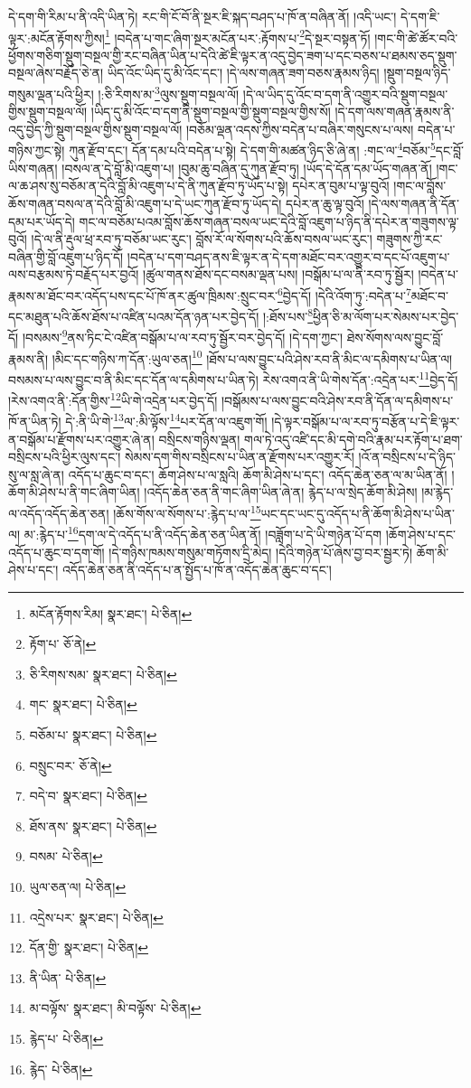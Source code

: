 དེ་དག་གི་རིམ་པ་ནི་འདི་ཡིན་ཏེ། རང་གི་ངོ་བོ་ནི་སྔར་ཇི་སྐད་བཤད་པ་ཁོ་ན་བཞིན་ནོ། །འདི་ཡང་། དེ་དག་ཇི་ལྟར་:མངོན་རྟོགས་ཀྱིས།\footnote{མངོན་རྟོགས་རིམ།  སྣར་ཐང་།  པེ་ཅིན། } །བདེན་པ་གང་ཞིག་སྔར་མངོན་པར་:རྟོགས་པ་\footnote{རྟོག་པ་  ཅོ་ནེ། }དེ་སྔར་བསྟན་ཏོ། །གང་གི་ཚེ་ཚོར་བའི་ཕྱོགས་གཅིག་སྡུག་བསྔལ་གྱི་རང་བཞིན་ཡིན་པ་དེའི་ཚེ་ཇི་ལྟར་ན་འདུ་བྱེད་ཟག་པ་དང་བཅས་པ་ཐམས་ཅད་སྡུག་བསྔལ་ཞེས་བརྗོད་ཅེ་ན། ཡིད་འོང་ཡིད་དུ་མི་འོང་དང་། །དེ་ལས་གཞན་ཟག་བཅས་རྣམས་ཉིད། །སྡུག་བསྔལ་ཉིད་གསུམ་ལྡན་པའི་ཕྱིར། །:ཅི་རིགས་མ་\footnote{ཅི་རིགས་སམ་  སྣར་ཐང་།  པེ་ཅིན། }ལུས་སྡུག་བསྔལ་ལོ། །དེ་ལ་ཡིད་དུ་འོང་བ་དག་ནི་འགྱུར་བའི་སྡུག་བསྔལ་གྱིས་སྡུག་བསྔལ་ལོ། །ཡིད་དུ་མི་འོང་བ་དག་ནི་སྡུག་བསྔལ་གྱི་སྡུག་བསྔལ་གྱིས་སོ། །དེ་དག་ལས་གཞན་རྣམས་ནི་འདུ་བྱེད་ཀྱི་སྡུག་བསྔལ་གྱིས་སྡུག་བསྔལ་ལོ། །བཅོམ་ལྡན་འདས་ཀྱིས་བདེན་པ་བཞིར་གསུངས་པ་ལས། བདེན་པ་གཉིས་ཀྱང་སྟེ། ཀུན་རྫོབ་དང་། དོན་དམ་པའི་བདེན་པ་སྟེ། དེ་དག་གི་མཚན་ཉིད་ཅི་ཞེ་ན། :གང་ལ་\footnote{གང་  སྣར་ཐང་།  པེ་ཅིན། }བཅོམ་\footnote{བཅོམ་པ་  སྣར་ཐང་།  པེ་ཅིན། }དང་བློ་ཡིས་གཞན། །བསལ་ན་དེ་བློ་མི་འཇུག་པ། །བུམ་ཆུ་བཞིན་དུ་ཀུན་རྫོབ་ཏུ། །ཡོད་དེ་དོན་དམ་ཡོད་གཞན་ནོ། །གང་ལ་ཆ་ཤས་སུ་བཅོམ་ན་དེའི་བློ་མི་འཇུག་པ་དེ་ནི་ཀུན་རྫོབ་ཏུ་ཡོད་པ་སྟེ། དཔེར་ན་བུམ་པ་ལྟ་བུའོ། །གང་ལ་བློས་ཆོས་གཞན་བསལ་ན་དེའི་བློ་མི་འཇུག་པ་དེ་ཡང་ཀུན་རྫོབ་ཏུ་ཡོད་དེ། དཔེར་ན་ཆུ་ལྟ་བུའོ། །དེ་ལས་གཞན་ནི་དོན་དམ་པར་ཡོད་དེ། གང་ལ་བཅོམ་པའམ་བློས་ཆོས་གཞན་བསལ་ཡང་དེའི་བློ་འཇུག་པ་ཉིད་ནི་དཔེར་ན་གཟུགས་ལྟ་བུའོ། །དེ་ལ་ནི་རྡུལ་ཕྲ་རབ་ཏུ་བཅོམ་ཡང་རུང་། བློས་རོ་ལ་སོགས་པའི་ཆོས་བསལ་ཡང་རུང་། གཟུགས་ཀྱི་རང་བཞིན་གྱི་བློ་འཇུག་པ་ཉིད་དོ། །བདེན་པ་དག་བཤད་ནས་ཇི་ལྟར་ན་དེ་དག་མཐོང་བར་འགྱུར་བ་དང་པོ་འཇུག་པ་ལས་བརྩམས་ཏེ་བརྗོད་པར་བྱའོ། །ཚུལ་གནས་ཐོས་དང་བསམ་ལྡན་པས། །བསྒོམ་པ་ལ་ནི་རབ་ཏུ་སྦྱོར། །བདེན་པ་རྣམས་མ་ཐོང་བར་འདོད་པས་དང་པོ་ཁོ་ནར་ཚུལ་ཁྲིམས་:སྲུང་བར་\footnote{བསྲུང་བར་  ཅོ་ནེ། }བྱེད་དོ། །དེའི་འོག་ཏུ་:བདེན་པ་\footnote{བདེ་བ་  སྣར་ཐང་།  པེ་ཅིན། }མཐོང་བ་དང་མཐུན་པའི་ཆོས་ཐོས་པ་འཛིན་པའམ་དོན་ཉན་པར་བྱེད་དོ། །:ཐོས་པས་\footnote{ཐོས་ནས་  སྣར་ཐང་།  པེ་ཅིན། }ཕྱིན་ཅི་མ་ལོག་པར་སེམས་པར་བྱེད་དོ། །བསམས་\footnote{བསམ་  པེ་ཅིན། }ནས་ཏིང་ངེ་འཛིན་བསྒོམ་པ་ལ་རབ་ཏུ་སྦྱོར་བར་བྱེད་དོ། །དེ་དག་ཀྱང་། ཐེས་སོགས་ལས་བྱུང་བློ་རྣམས་ནི། །མིང་དང་གཉིས་ཀ་དོན་:ཡུལ་ཅན།\footnote{ཡུལ་ཅན་ལ།  པེ་ཅིན། } །ཐོས་པ་ལས་བྱུང་པའི་ཤེས་རབ་ནི་མིང་ལ་དམིགས་པ་ཡིན་ལ། བསམས་པ་ལས་བྱུང་བ་ནི་མིང་དང་དོན་ལ་དམིགས་པ་ཡིན་ཏེ། རེས་འགའ་ནི་ཡི་གེས་དོན་:འདྲེན་པར་\footnote{འདྲེས་པར་  སྣར་ཐང་།  པེ་ཅིན། }བྱེད་དོ། །རེས་འགའ་ནི་:དོན་གྱིས་\footnote{དོན་གྱི་  སྣར་ཐང་།  པེ་ཅིན། }ཡི་གེ་འདྲེན་པར་བྱེད་དོ། །བསྒོམས་པ་ལས་བྱུང་བའི་ཤེས་རབ་ནི་དོན་ལ་དམིགས་པ་ཁོ་ན་ཡིན་ཏེ། དེ་:ནི་ཡི་གེ་\footnote{ནི་ཡིན་  པེ་ཅིན། }ལ་:མི་ལྟོས་\footnote{མ་བལྟོས་  སྣར་ཐང་། མི་བལྟོས་  པེ་ཅིན། }པར་དོན་ལ་འཇུག་གོ། །དེ་ལྟར་བསྒོམ་པ་ལ་རབ་ཏུ་བརྩོན་པ་དེ་ཇི་ལྟར་ན་བསྒོམ་པ་རྫོགས་པར་འགྱུར་ཞེ་ན། བསྲིངས་གཉིས་ལྡན། གལ་ཏེ་འདུ་འཛི་དང་མི་དགེ་བའི་རྣམ་པར་རྟོག་པ་ཐག་བསྲིངས་པའི་ཕྱིར་ལུས་དང་། སེམས་དག་གིས་བསྲིངས་པ་ཡིན་ན་རྫོགས་པར་འགྱུར་རོ། །འོ་ན་བསྲིངས་པ་དེ་ཉིད་སུ་ལ་སླ་ཞེ་ན། འདོད་པ་ཆུང་བ་དང་། ཆོག་ཤེས་པ་ལ་སླའི། ཆོག་མི་ཤེས་པ་དང་། འདོད་ཆེན་ཅན་ལ་མ་ཡིན་ནོ། །ཆོག་མི་ཤེས་པ་ནི་གང་ཞིག་ཡིན། །འདོད་ཆེན་ཅན་ནི་གང་ཞིག་ཡིན་ཞེ་ན། རྙེད་པ་ལ་སྲེད་ཆོག་མི་ཤེས། །མ་རྙེད་ལ་འདོད་འདོད་ཆེན་ཅན། །ཆོས་གོས་ལ་སོགས་པ་:རྙེད་པ་ལ་\footnote{རྙེད་པ་  པེ་ཅིན། }ཡང་དང་ཡང་དུ་འདོད་པ་ནི་ཆོག་མི་ཤེས་པ་ཡིན་ལ། མ་:རྙེད་པ་\footnote{རྙེད་  པེ་ཅིན། }དག་ལ་དེ་འདོད་པ་ནི་འདོད་ཆེན་ཅན་ཡིན་ནོ། །བཟློག་པ་དེ་ཡི་གཉེན་པོ་དག །ཆོག་ཤེས་པ་དང་འདོད་པ་ཆུང་བ་དག་གོ། །དེ་གཉིས་ཁམས་གསུམ་གཏོགས་དྲི་མེད། །དེའི་གཉེན་པོ་ཞེས་བྱ་བར་སྦྱར་ཏེ། ཆོག་མི་ཤེས་པ་དང་། འདོད་ཆེན་ཅན་ནི་འདོད་པ་ན་སྤྱོད་པ་ཁོ་ན་འདོད་ཆེན་ཆུང་བ་དང་། 